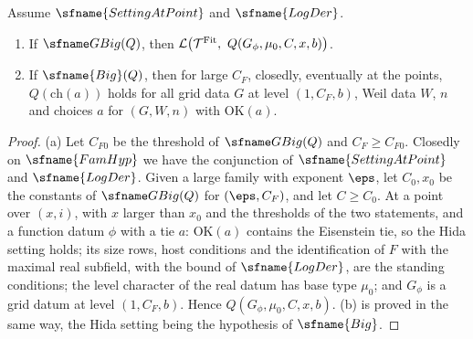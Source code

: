 \begin{lemma}[Transfer]\label{pf:fit:transfer}
Assume $\sfname{SettingAtPoint}$ and $\sfname{LogDer}$.
\begin{enumerate}[label=(\alph*)]
\item If $\fitGBig(Q)$, then $\mathcal L\bigl(\mathcal T^{\fitFit},\ Q(G_\phi,\mu_0,C,x,b)\bigr)$.
\item If $\sfname{Big}(Q)$, then for large $C_F$, closedly, eventually at the points, $Q(\mathrm{ch}(a))$ holds for all grid
data $G$ at level $(1,C_F,b)$, Weil data $W$, $n$ and choices $a$ for $(G,W,n)$ with $\mathrm{OK}(a)$.
\end{enumerate}
\end{lemma}

\begin{proof}
(a) Let $C_{F0}$ be the threshold of $\fitGBig(Q)$ and $C_F\ge C_{F0}$. Closedly on $\sfname{FamHyp}$ we have the conjunction
of $\sfname{SettingAtPoint}$ and $\sfname{LogDer}$. Given a large family with exponent $\eps$, let $C_0,x_0$ be the
constants of $\fitGBig(Q)$ for $(\eps,C_F)$, and let $C\ge C_0$. At a point over $(x,i)$, with $x$ larger than $x_0$ and the
thresholds of the two statements, and a function datum $\phi$ with a tie $a$: $\mathrm{OK}(a)$ contains the Eisenstein tie, so
the Hida setting holds; its size rows, host conditions and the identification of $F$ with the maximal real subfield, with
the bound of $\sfname{LogDer}$, are the standing conditions; the level character of the real datum has base type $\mu_0$;
and $G_\phi$ is a grid datum at level $(1,C_F,b)$. Hence $Q(G_\phi,\mu_0,C,x,b)$. (b) is proved in the same way, the Hida setting
being the hypothesis of $\sfname{Big}$.
\end{proof}

